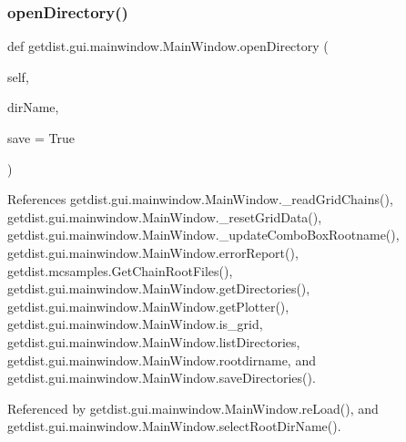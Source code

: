 \subsubsection{\texorpdfstring{open\+Directory()}{openDirectory()}}
{\footnotesize\ttfamily def getdist.\+gui.\+mainwindow.\+Main\+Window.\+open\+Directory (\begin{DoxyParamCaption}\item[{}]{self,  }\item[{}]{dir\+Name,  }\item[{}]{save = {\ttfamily True} }\end{DoxyParamCaption})}



References getdist.\+gui.\+mainwindow.\+Main\+Window.\+\_\+read\+Grid\+Chains(), getdist.\+gui.\+mainwindow.\+Main\+Window.\+\_\+reset\+Grid\+Data(), getdist.\+gui.\+mainwindow.\+Main\+Window.\+\_\+update\+Combo\+Box\+Rootname(), getdist.\+gui.\+mainwindow.\+Main\+Window.\+error\+Report(), getdist.\+mcsamples.\+Get\+Chain\+Root\+Files(), getdist.\+gui.\+mainwindow.\+Main\+Window.\+get\+Directories(), getdist.\+gui.\+mainwindow.\+Main\+Window.\+get\+Plotter(), getdist.\+gui.\+mainwindow.\+Main\+Window.\+is\+\_\+grid, getdist.\+gui.\+mainwindow.\+Main\+Window.\+list\+Directories, getdist.\+gui.\+mainwindow.\+Main\+Window.\+rootdirname, and getdist.\+gui.\+mainwindow.\+Main\+Window.\+save\+Directories().



Referenced by getdist.\+gui.\+mainwindow.\+Main\+Window.\+re\+Load(), and getdist.\+gui.\+mainwindow.\+Main\+Window.\+select\+Root\+Dir\+Name().


